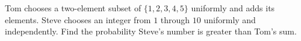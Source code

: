 Tom chooses a two-element subset of $\{1,2,3,4,5\}$ uniformly and adds its elements. Steve chooses an integer from $1$ through $10$ uniformly and independently. Find the probability Steve's number is greater than Tom's sum.

